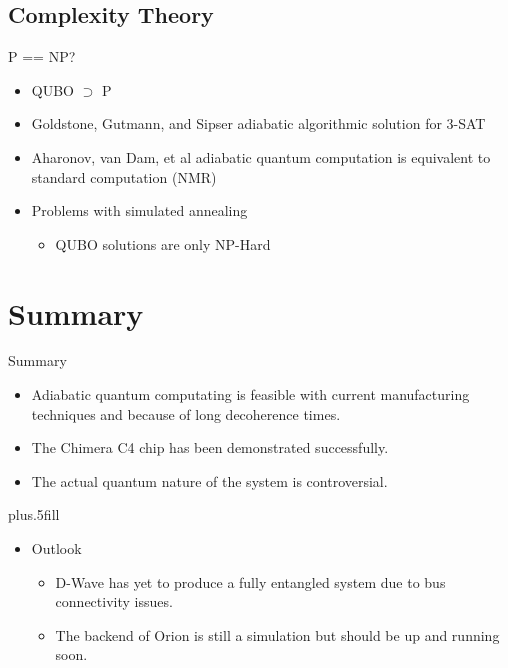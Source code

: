 \documentclass{beamer}
\begin{document}
\subsection{Complexity Theory}

\begin{frame}{P == NP?}
 \begin{itemize}
  \item QUBO \(\supset\) P
  \pause
  \item Goldstone, Gutmann, and Sipser adiabatic algorithmic solution for 3-SAT
  \item Aharonov, van Dam, et al adiabatic quantum computation is equivalent to standard computation (NMR)
  \pause
  \item Problems with simulated annealing
  \begin{itemize}
   \item QUBO solutions are only NP-Hard
  \end{itemize}


 \end{itemize}

\end{frame}


\section*{Summary}

\begin{frame}{Summary}

  \begin{itemize}
  \item
    Adiabatic quantum computating is feasible with current manufacturing techniques and because of long decoherence times.
  \item
    The Chimera C4 chip has been demonstrated successfully.
  \item
    The actual quantum nature of the system is controversial.
  \end{itemize}
  
  \vskip0pt plus.5fill
  \begin{itemize}
  \item
    Outlook
    \begin{itemize}
    \item
      D-Wave has yet to produce a fully entangled system due to bus connectivity issues.
    \item
      The backend of Orion is still a simulation but should be up and running soon.
    \end{itemize}
  \end{itemize}
\end{frame}
\end{document}
